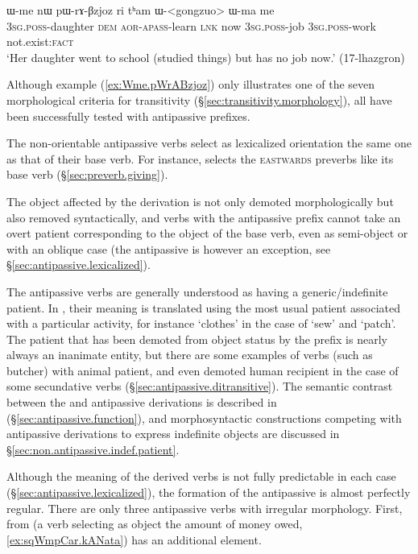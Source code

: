 \begin{exe}
\ex \label{ex:Wme.pWrABzjoz}
\gll ɯ-me nɯ pɯ-rɤ-βzjoz ri tʰam ɯ-<gongzuo> ɯ-ma me \\
\textsc{3sg}.\textsc{poss}-daughter \textsc{dem} \textsc{aor}-\textsc{apass}-learn \textsc{lnk} now \textsc{3sg}.\textsc{poss}-job \textsc{3sg}.\textsc{poss}-work not.exist:\textsc{fact} \\
\glt `Her daughter went to school (studied things) but has no job now.' (17-lhazgron)
\end{exe}

Although example (\ref{ex:Wme.pWrABzjoz}) only illustrates one of the seven morphological criteria for transitivity (§\ref{sec:transitivity.morphology}), all have been successfully tested with antipassive prefixes.

The non-orientable antipassive verbs select as lexicalized orientation the same one as that of their base verb. For instance,  selects the \textsc{eastwards} preverbs like its base verb  (§\ref{sec:preverb.giving}).

The object affected by the  derivation is not only demoted morphologically but also removed syntactically, and verbs with the antipassive prefix cannot take an overt patient corresponding to the object of the base verb, even as semi-object or with an oblique case (the antipassive  is however an exception, see §\ref{sec:antipassive.lexicalized}).

The antipassive verbs are generally understood as having a generic/indefinite patient. In , their meaning is translated using the most usual patient associated with a particular activity, for instance `clothes' in the case of  `sew' and  `patch'.  The patient that has been demoted from object status by the  prefix is nearly always an inanimate entity, but there are some examples of verbs (such as  {butcher}) with animal patient, and even demoted human recipient in the case of some secundative verbs (§\ref{sec:antipassive.ditransitive}). The semantic contrast between the  and  antipassive derivations is described in (§\ref{sec:antipassive.function}), and morphosyntactic constructions competing with antipassive derivations to express indefinite objects are discussed in §\ref{sec:non.antipassive.indef.patient}.


Although the meaning of the derived verbs is not fully predictable in each case (§\ref{sec:antipassive.lexicalized}), the formation of the  antipassive is almost perfectly regular. There are only three  antipassive verbs with irregular morphology. First,   from   (a verb selecting as object the amount of money owed, \ref{ex:sqWmpCar.kANata}) has an additional  element. 

